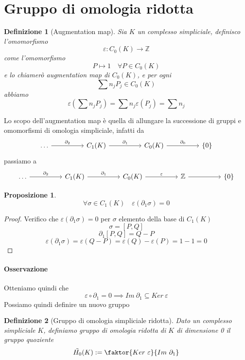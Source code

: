 \documentclass[a4paper]{report}
\newtheorem{proposition}{Proposizione}
\newtheorem{definition}{Definizione}
\newcommand{\Z}{\ensuremath{\mathbb{Z}}}
\newcommand{\ra}{\ensuremath{\rightarrow}}
\begin{document}
\section{Gruppo di omologia ridotta}
\begin{definition}[Augmentation map]
    Sia $K$ un complesso simpliciale, definisco l'omomorfismo
    \[
        \varepsilon:C_0(K)\ra\Z
    \]
    come l'omomorfismo
    \[
        P\longmapsto 1\quad \forall P\in C_0(K)
    \]
    e lo chiamerò augmentation map di $C_0(K)$, e per ogni
    \[
        \sum n_jP_j\in C_0(K)
    \]
    abbiamo
    \[
        \varepsilon\left(\sum n_jP_j\right)=\sum n_j\varepsilon(P_j)=\sum n_j
    \]
\end{definition}
Lo scopo dell'augmentation map è quella di allungare la successione di gruppi e omomorfismi di omologia simpliciale, infatti da
\[\begin{tikzcd}
        \dots && {C_1(K)} && {C_0(K)} && {\{0\}}
        \arrow["{\partial_2}", from=1-1, to=1-3]
        \arrow["{\partial_1}", from=1-3, to=1-5]
        \arrow["{\partial_0}", from=1-5, to=1-7]
    \end{tikzcd}\]
passiamo a
\[\begin{tikzcd}
        \dots && {C_1(K)} && {C_0(K)} && \Z && {\{0\}}
        \arrow["{\partial_2}", from=1-1, to=1-3]
        \arrow["{\partial_1}", from=1-3, to=1-5]
        \arrow["\varepsilon", from=1-5, to=1-7]
        \arrow[from=1-7, to=1-9]
    \end{tikzcd}\]
\begin{proposition}
    \[
        \forall\sigma\in C_1(K)\quad \varepsilon(\partial_1\sigma)=0
    \]
\end{proposition}
\begin{proof}
    Verifico che $\varepsilon(\partial_1\sigma)=0$ per $\sigma$ elemento della base di $C_1(K)$
    \[
        \sigma=[P,Q]
    \]
    \[
        \partial_1[P,Q]=Q-P
    \]
    \[
        \varepsilon(\partial_1\sigma)=\varepsilon(Q-P)=\varepsilon(Q)-\varepsilon(P)=1-1=0
    \]
\end{proof}
\paragraph{Osservazione} Otteniamo quindi che
\[
    \varepsilon\circ\partial_1=0\implies Im\ \partial_1\subseteq Ker\ \varepsilon
\]
Possiamo quindi definire un nuovo gruppo
\begin{definition}[Gruppo di omologia simpliciale ridotta]
    Dato un complesso simpliciale $K$, definiamo gruppo di omologia ridotta di $K$ di dimensione 0 il gruppo quoziente
    \[
        \tilde{H_0}(K):=\faktor{Ker\ \varepsilon}{Im\ \partial_1}
    \]
\end{definition}
\end{document}
